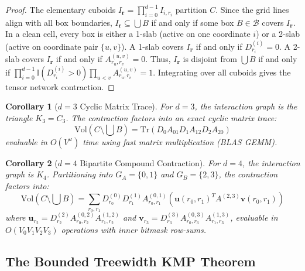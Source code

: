 \documentclass[11pt,a4paper]{article}
\theoremstyle{plain}
\newtheorem{corollary}{Corollary}
\theoremstyle{definition}
\begin{document}
\begin{proof}
The elementary cuboids $I_{\mathbf{r}} = \prod_{i=0}^{d-1} I_{i, r_i}$ partition $C$. Since the grid lines align with all box boundaries, $I_{\mathbf{r}} \subseteq \bigcup B$ if and only if some box $B \in \mathcal{B}$ covers $I_{\mathbf{r}}$. In a clean cell, every box is either a 1-slab (active on one coordinate $i$) or a 2-slab (active on coordinate pair $\{u, v\}$). A 1-slab covers $I_{\mathbf{r}}$ if and only if $D^{(i)}_{r_i} = 0$. A 2-slab covers $I_{\mathbf{r}}$ if and only if $A^{(u, v)}_{r_u, r_v} = 0$. Thus, $I_{\mathbf{r}}$ is disjoint from $\bigcup B$ if and only if $\prod_{i=0}^{d-1} \mathbb{I}(D^{(i)}_{r_i} > 0) \prod_{u < v} A^{(u, v)}_{r_u, r_v} = 1$. Integrating over all cuboids gives the tensor network contraction.
\end{proof}

\begin{corollary}[$d=3$ Cyclic Matrix Trace]
For $d=3$, the interaction graph is the triangle $K_3 = C_3$. The contraction factors into an exact cyclic matrix trace:
\begin{equation}
\mathrm{Vol}\left(C \setminus \bigcup B\right) = \mathrm{Tr}\left(D_0 A_{01} D_1 A_{12} D_2 A_{20}\right)
\end{equation}
evaluable in $O(V^\omega)$ time using fast matrix multiplication (BLAS GEMM).
\end{corollary}

\begin{corollary}[$d=4$ Bipartite Compound Contraction]
For $d=4$, the interaction graph is $K_4$. Partitioning into $G_A = \{0, 1\}$ and $G_B = \{2, 3\}$, the contraction factors into:
\begin{equation}
\mathrm{Vol}\left(C \setminus \bigcup B\right) = \sum_{r_0, r_1} D^{(0)}_{r_0} D^{(1)}_{r_1} A^{(0, 1)}_{r_0, r_1} \left( \mathbf{u}(r_0, r_1)^T A^{(2, 3)} \mathbf{v}(r_0, r_1) \right)
\end{equation}
where $\mathbf{u}_{r_2} = D^{(2)}_{r_2} A^{(0, 2)}_{r_0, r_2} A^{(1, 2)}_{r_1, r_2}$ and $\mathbf{v}_{r_3} = D^{(3)}_{r_3} A^{(0, 3)}_{r_0, r_3} A^{(1, 3)}_{r_1, r_3}$, evaluable in $O(V_0 V_1 V_2 V_3)$ operations with inner bitmask row-sums.
\end{corollary}

\subsection{The Bounded Treewidth KMP Theorem}
\label{sec:bounded_treewidth}
\end{document}
